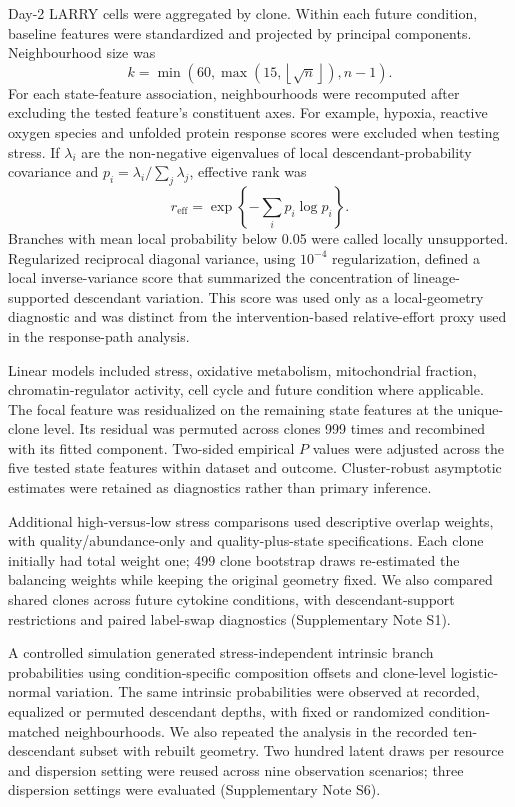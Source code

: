 \documentclass[a4paper,fleqn]{cas-sc}
\makeatletter
\DeclareRobustCommand{\rev}[1]{{\color{red}\def\@citecolor{black}\def\@linkcolor{red}\def\@urlcolor{red}#1}}
\let\unmarkedcite\cite
\renewcommand{\cite}[1]{{\color{black}\def\@citecolor{black}\unmarkedcite{#1}}}
\makeatother
\begin{document}
Day-2 LARRY cells were aggregated by clone. Within each future condition, baseline features were standardized and projected by principal components. Neighbourhood size was
\begin{equation}
k=\min\left(60,\max\left(15,\left\lfloor\sqrt{n}\right\rfloor\right),n-1\right).
\end{equation}
For each state-feature association, neighbourhoods were recomputed after excluding the tested feature's constituent axes. For example, hypoxia, reactive oxygen species and unfolded protein response scores were excluded when testing stress. If $\lambda_i$ are the non-negative eigenvalues of local descendant-probability covariance and $p_i=\lambda_i/\sum_j\lambda_j$, effective rank was
\begin{equation}
r_{\mathrm{eff}}=\exp\left\{-\sum_i p_i\log p_i\right\}.
\end{equation}
Branches with mean local probability below 0.05 were called locally unsupported. Regularized reciprocal diagonal variance, using $10^{-4}$ regularization, defined a local inverse-variance score that summarized the concentration of lineage-supported descendant variation. This score was used only as a local-geometry diagnostic and was distinct from the intervention-based relative-effort proxy used in the response-path analysis.

Linear models included stress, oxidative metabolism, mitochondrial fraction, chromatin-regulator activity, cell cycle and future condition where applicable. The focal feature was residualized on the remaining state features at the unique-clone level. Its residual was permuted across clones 999 times and recombined with its fitted component. Two-sided empirical $P$ values were adjusted across the five tested state features within dataset and outcome. Cluster-robust asymptotic estimates were retained as diagnostics rather than primary inference.

Additional high-versus-low stress comparisons used descriptive overlap weights,\cite{li2018overlap} with quality/abundance-only and quality-plus-state specifications. Each clone initially had total weight one; 499 clone bootstrap draws re-estimated the balancing weights while keeping the original geometry fixed. We also compared shared clones across future cytokine conditions, with descendant-support restrictions and paired label-swap diagnostics (Supplementary Note S1).

\rev{A controlled simulation generated stress-independent intrinsic branch probabilities using condition-specific composition offsets and clone-level logistic-normal variation.} \rev{The same intrinsic probabilities were observed at recorded, equalized or permuted descendant depths, with fixed or randomized condition-matched neighbourhoods.} \rev{We also repeated the analysis in the recorded ten-descendant subset with rebuilt geometry.} \rev{Two hundred latent draws per resource and dispersion setting were reused across nine observation scenarios; three dispersion settings were evaluated (Supplementary Note S6).}
\end{document}
